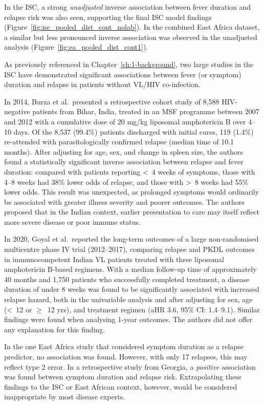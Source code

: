 In the ISC, a strong \textit{unadjusted} inverse association between fever duration and relapse risk was also seen, supporting the final ISC model findings (Figure~\ref{fig:isc_pooled_dist_cont_nolab}). In the combined East Africa dataset, a similar but less pronounced inverse association was observed in the unadjusted analysis (Figure~\ref{fig:ea_pooled_dist_cont1}).

As previously referenced in Chapter~\ref{ch:1-background}, two large studies in the ISC have demonstrated significant associations between fever (or symptom) duration and relapse in patients without VL/HIV co-infection.

In 2014, Burza et al.\ presented a retrospective cohort study of 8,588 HIV-negative patients from Bihar, India, treated in an MSF programme between 2007 and 2012 with a cumulative dose of 20 mg/kg liposomal amphotericin B over 4--10 days\cite{burza2014}. Of the 8,537 (99.4\%) patients discharged with initial cures, 119 (1.4\%) re-attended with parasitologically confirmed relapse (median time of 10.1 months). After adjusting for age, sex, and change in spleen size, the authors found a statistically significant inverse association between relapse and fever duration: compared with patients reporting <~4 weeks of symptoms, those with 4--8 weeks had 38\% lower odds of relapse, and those with >~8 weeks had 55\% lower odds. This result was unexpected, as prolonged symptoms would ordinarily be associated with greater illness severity and poorer outcomes. The authors proposed that in the Indian context, earlier presentation to care may itself reflect more severe disease or poor immune status.

In 2020, Goyal et al.\ reported the long-term outcomes of a large non-randomised multicentre phase IV trial (2012--2017), comparing relapse and PKDL outcomes in immunocompetent Indian VL patients treated with three liposomal amphotericin B-based regimens\cite{goyal2018, goyal2020}. With a median follow-up time of approximately 40 months and 1,750 patients who successfully completed treatment, a disease duration of under 8 weeks was found to be significantly associated with increased relapse hazard, both in the univariable analysis and after adjusting for sex, age (<~12 or $\geq$~12 yrs), and treatment regimen (aHR 3.6, 95\% CI: 1.4--9.1). Similar findings were found when analysing 1-year outcomes\cite{goyal2019}. The authors did not offer any explanation for this finding.

In the one East Africa study that considered symptom duration as a relapse predictor, no association was found. However, with only 17 relapses, this may reflect type 2 error\cite{kennedy2024}. In a retrospective study from Georgia, a \textit{positive} association was found between symptom duration and relapse risk\cite{kajaia2011}. Extrapolating these findings to the ISC or East African context, however, would be considered inappropriate by most disease experts.

